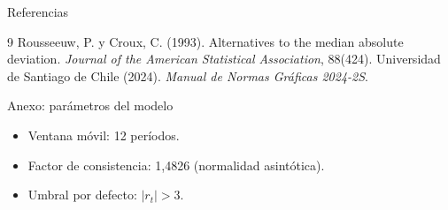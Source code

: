 \documentclass[11pt,aspectratio=169]{beamer}
\begin{document}
\begin{frame}[allowframebreaks]{Referencias}
  \begin{thebibliography}{9}
      Rousseeuw, P. y Croux, C. (1993).
      \newblock Alternatives to the median absolute deviation.
      \newblock \emph{Journal of the American Statistical Association}, 88(424).
      Universidad de Santiago de Chile (2024).
      \newblock \emph{Manual de Normas Gráficas 2024-2S}.
  \end{thebibliography}
\end{frame}


\appendix

\begin{frame}{Anexo: parámetros del modelo}
  \begin{itemize}
    \item Ventana móvil: 12 períodos.
    \item Factor de consistencia: 1,4826 (normalidad asintótica).
    \item Umbral por defecto: $|r_t| > 3$.
  \end{itemize}
\end{frame}
\end{document}
